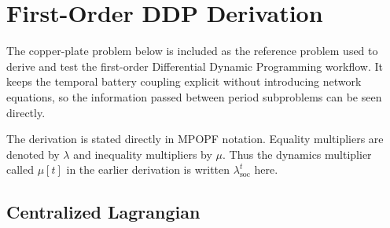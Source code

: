 \section{First-Order DDP Derivation}
\label{app:user_ddp}

The copper-plate problem below is included as the reference problem used to
derive and test the first-order Differential Dynamic Programming workflow. It
keeps the temporal battery coupling explicit without introducing network
equations, so the information passed between period subproblems can be seen
directly.




The derivation is stated directly in MPOPF notation. Equality multipliers are denoted by $\lambda$ and
inequality multipliers by $\mu$.  Thus the dynamics multiplier called $\mu[t]$
in the earlier derivation is written $\lambda_{\mathrm{soc}}^t$ here.

\subsection{Centralized Lagrangian}

\noindent{}

